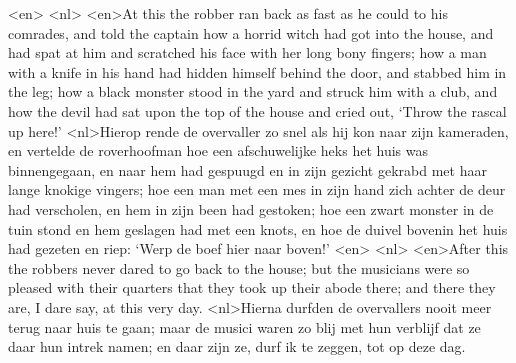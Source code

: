 <en>
<nl>
<en>At this the robber ran back as fast as he could to his comrades, and told the captain how a horrid witch had got into the house, and had spat at him and scratched his face with her long bony fingers; how a man with a knife in his hand had hidden himself behind the door, and stabbed him in the leg; how a black monster stood in the yard and struck him with a club, and how the devil had sat upon the top of the house and cried out, `Throw the rascal up here!'
<nl>Hierop rende de overvaller zo snel als hij kon naar zijn kameraden, en vertelde de roverhoofman hoe een afschuwelijke heks het huis was binnengegaan, en naar hem had gespuugd en in zijn gezicht gekrabd met haar lange knokige vingers; hoe een man met een mes in zijn hand zich achter de deur had verscholen, en hem in zijn been had gestoken; hoe een zwart monster in de tuin stond en hem geslagen had met een knots, en hoe de duivel bovenin het huis had gezeten en riep: `Werp de boef hier naar boven!'
<en>
<nl>
<en>After this the robbers never dared to go back to the house; but the musicians were so pleased with their quarters that they took up their abode there; and there they are, I dare say, at this very day.
<nl>Hierna durfden de overvallers nooit meer terug naar huis te gaan; maar de musici waren zo blij met hun  verblijf dat ze daar hun intrek namen; en daar zijn ze, durf ik te zeggen, tot op deze dag.
